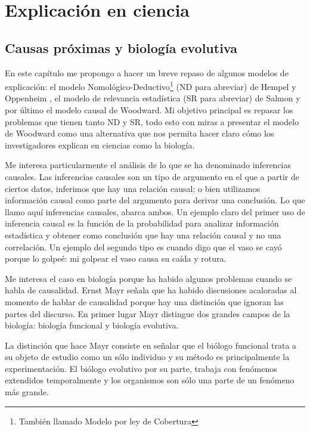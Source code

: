 \chapter{Explicación en ciencia}

\section{Causas próximas y biología evolutiva}

\noindent En este capítulo me propongo a hacer un breve repaso de algunos modelos de explicación: el modelo Nomológico-Deductivo\footnote{También llamado Modelo por ley de Cobertura} (ND para abreviar) de Hempel y Oppenheim , el modelo de relevancia estadística (SR para abreviar) de Salmon y por último el modelo causal de Woodward. Mi objetivo principal es repasar los problemas que tienen tanto ND y SR, todo esto con miras a presentar el modelo de Woodward como una alternativa que nos permita hacer claro cómo los investigadores explican en ciencias como la biología.

Me interesa particularmente el análisis de lo que se ha denominado inferencias causales. Las inferencias causales son un tipo de argumento en el que a partir de ciertos datos, inferimos que hay una relación causal; o bien utilizamos información causal como parte del argumento para derivar una conclusión. Lo que llamo aquí inferencias causales, abarca ambos. Un ejemplo claro del primer uso de inferencia causal es la función de la probabilidad para analizar información estadística y obtener como conclusión que hay una relación causal y no una correlación. Un ejemplo del segundo tipo es cuando digo que el vaso se cayó porque lo golpeé: mi golpear el vaso causa su caída y rotura.

Me interesa el caso en biología porque ha habido algunos problemas cuando se habla de causalidad. Ernst Mayr \citeyear{Mayr1998} señala que ha habido discusiones acaloradas al momento de hablar de causalidad porque hay una distinción que ignoran las partes del discurso. En primer lugar Mayr distingue dos grandes campos de la biología: biología funcional y biología evolutiva.

La distinción que hace Mayr consiste en señalar que el biólogo funcional trata a su objeto de estudio como un sólo individuo y su método es principalmente la experimentación. El biólogo evolutivo por su parte, trabaja con fenómenos extendidos temporalmente y los organismos son sólo una parte de un fenómeno más grande.

